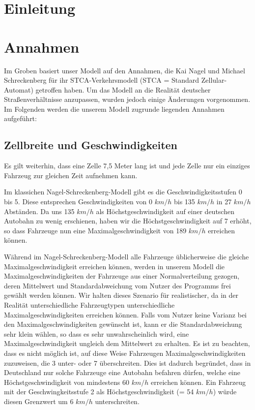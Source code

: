 \documentclass[11pt, a4paper]{article}
\newcommand\nsm{Nagel-Schreckenberg-Modell }
\begin{document}
\tableofcontents

\newpage


\section{Einleitung}
\label{sec:einleitung}

\newpage
\section{Annahmen}
\label{sec:annahmen}

Im Groben basiert unser Modell auf den Annahmen, die Kai Nagel und Michael Schreckenberg \cite{nagel-schreckenberg} für ihr STCA-Verkehrsmodell (STCA = Standard Zellular-Automat) getroffen haben. Um das Modell an die Realität deutscher Straßenverhältnisse anzupassen, wurden jedoch einige Änderungen vorgenommen.
Im Folgenden werden die unserem Modell zugrunde liegenden Annahmen aufgeführt:%


\subsection{Zellbreite und Geschwindigkeiten}

Es gilt weiterhin, dass eine Zelle 7,5 Meter lang ist und jede Zelle nur ein einziges Fahrzeug zur gleichen Zeit aufnehmen kann.

Im klassichen \nsm gibt es die Geschwindigkeitsstufen 0 bis 5. Diese entsprechen Geschwindigkeiten von 0 $km/h$ bis 135 $km/h$ in 27 $km/h$ Abständen. Da uns 135 $km/h$ als Höchstgeschwindigkeit auf einer deutschen Autobahn zu wenig erschienen, haben wir die Höchstgeschwindigkeit auf 7 erhöht, so dass Fahrzeuge nun eine Maximalgeschwindigkeit von 189 $km/h$ erreichen können.

Während im \nsm alle Fahrzeuge üblicherweise die gleiche Maximalgeschwindigkeit erreichen können, werden in unserem Modell die Maximalgeschwindigkeiten der Fahrzeuge aus einer Normalverteilung gezogen, deren Mittelwert und Standardabweichung vom Nutzer des Programms frei gewählt werden können. Wir halten dieses Szenario für realistischer, da in der Realität unterschiedliche Fahrzeugtypen unterschiedliche Maximalgeschwindigkeiten erreichen können. Falls vom Nutzer keine Varianz bei den Maximalgeschwindigkeiten gewünscht ist, kann er die Standardabweichung sehr klein wählen, so dass es sehr unwahrscheinlich wird, eine Maximalgeschwindigkeit ungleich dem Mittelwert zu erhalten. Es ist zu beachten, dass es nicht möglich ist, auf diese Weise Fahrzeugen Maximalgeschwindigkeiten zuzuweisen, die 3 unter- oder 7 überschreiten. Dies ist dadurch begründet, dass in Deutschland nur solche Fahrzeuge eine Autobahn befahren dürfen, welche eine Höchstgeschwindigkeit von mindestens 60 $km/h$ erreichen können. Ein Fahrzeug mit der Geschwingkeitsstufe 2 als Höchstgeschwindigkeit (= 54 $km/h$) würde diesen Grenzwert um 6 $km/h$ unterschreiten.
\end{document}

